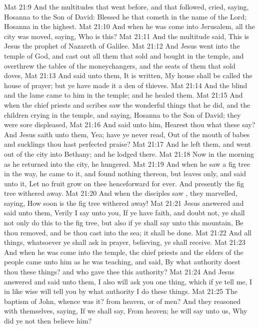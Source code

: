 \vs Mat 21:9 And the multitudes that went before, and that followed, cried, saying, Hosanna to the Son of David: Blessed  he that cometh in the name of the Lord; Hosanna in the highest.
\vs Mat 21:10 And when he was come into Jerusalem, all the city was moved, saying, Who is this?
\vs Mat 21:11 And the multitude said, This is Jesus the prophet of Nazareth of Galilee.
\vs Mat 21:12 And Jesus went into the temple of God, and cast out all them that sold and bought in the temple, and overthrew the tables of the moneychangers, and the seats of them that sold doves,
\vs Mat 21:13 And said unto them, It is written, My house shall be called the house of prayer; but ye have made it a den of thieves.
\vs Mat 21:14 And the blind and the lame came to him in the temple; and he healed them.
\vs Mat 21:15 And when the chief priests and scribes saw the wonderful things that he did, and the children crying in the temple, and saying, Hosanna to the Son of David; they were sore displeased,
\vs Mat 21:16 And said unto him, Hearest thou what these say? And Jesus saith unto them, Yea; have ye never read, Out of the mouth of babes and sucklings thou hast perfected praise?
\vs Mat 21:17 And he left them, and went out of the city into Bethany; and he lodged there.
\vs Mat 21:18 Now in the morning as he returned into the city, he hungered.
\vs Mat 21:19 And when he saw a fig tree in the way, he came to it, and found nothing thereon, but leaves only, and said unto it, Let no fruit grow on thee henceforward for ever. And presently the fig tree withered away.
\vs Mat 21:20 And when the disciples saw , they marvelled, saying, How soon is the fig tree withered away!
\vs Mat 21:21 Jesus answered and said unto them, Verily I say unto you, If ye have faith, and doubt not, ye shall not only do this  to the fig tree, but also if ye shall say unto this mountain, Be thou removed, and be thou cast into the sea; it shall be done.
\vs Mat 21:22 And all things, whatsoever ye shall ask in prayer, believing, ye shall receive.
\vs Mat 21:23 And when he was come into the temple, the chief priests and the elders of the people came unto him as he was teaching, and said, By what authority doest thou these things? and who gave thee this authority?
\vs Mat 21:24 And Jesus answered and said unto them, I also will ask you one thing, which if ye tell me, I in like wise will tell you by what authority I do these things.
\vs Mat 21:25 The baptism of John, whence was it? from heaven, or of men? And they reasoned with themselves, saying, If we shall say, From heaven; he will say unto us, Why did ye not then believe him?
